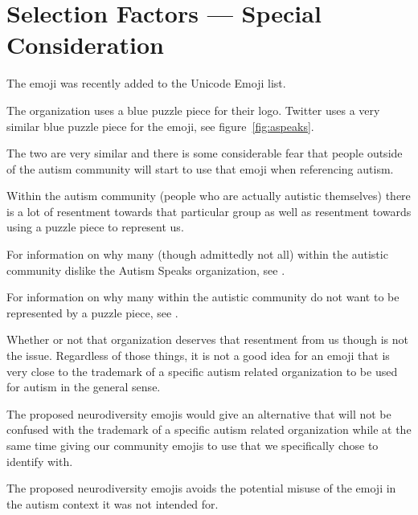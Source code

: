 \section{Selection Factors --- Special Consideration}

The emoji \jigsawemoji{} was recently added to the Unicode Emoji list.

The organization  uses a blue puzzle
piece for their logo. Twitter uses a very similar blue
puzzle piece for the \jigsawemoji{} emoji, see figure~\ref{fig:aspeaks}.

The two are very similar and there is some considerable fear that people outside of the
autism community will start to use that emoji when referencing autism.

Within the autism community (people who are actually autistic themselves) there is a lot of
resentment towards that particular group as well as resentment towards using a puzzle piece
to represent us.

For information on why many (though admittedly not all) within the autistic community dislike
the Autism Speaks organization, see
.

For information on why many within the autistic community do not want to be represented by a
puzzle piece, see
.

Whether or not that organization deserves that resentment from us though is not the issue.
Regardless of those things, it is not a good idea for an emoji that is very close to the
trademark of a specific autism related organization to be used for autism in the general
sense.

The proposed neurodiversity emojis would give an alternative that will not be confused
with the trademark of a specific autism related organization while at the same time giving our
community emojis to use that we specifically chose to identify with.

The proposed neurodiversity emojis avoids the potential misuse of the \jigsawemoji{}
emoji in the autism context it was not intended for.

